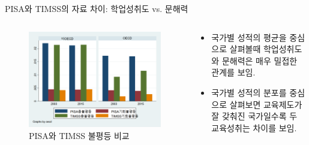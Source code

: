 \documentclass[aspectratio=169,xcolor=dvipsnames,handout]{beamer}
\begin{document}
\begin{frame}{PISA와 TIMSS의 자료 차이: 학업성취도 vs. 문해력}
\begin{columns}
    \begin{column}{.5\textwidth}
        \begin{figure}
            \centering
            \includegraphics[scale=0.2]{fig/bar_pntcompare.png}
            \caption{PISA와 TIMSS 불평등 비교}
        \end{figure}
    \end{column}    
    \begin{column}{.5\textwidth}
        \begin{itemize}
            \item 국가별 성적의 평균을 중심으로 살펴볼때 학업성취도와 문해력은 매우 밀접한 관계를 보임.
            \item 국가별 성적의 분포를 중심으로 살펴보면 교육제도가 잘 갖춰진 국가일수록 두 교육성취는 차이를 보임. 
        \end{itemize}
    \end{column}    
\end{columns}
\end{frame}
\end{document}
